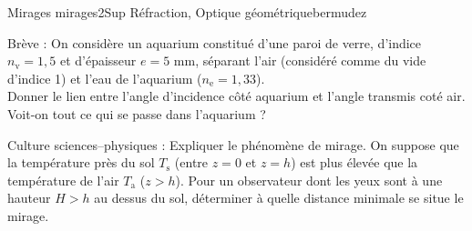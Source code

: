 \begin{exercise}{Mirages mirages}{2}{Sup}
{Réfraction, Optique géométrique}{bermudez}

\begin{questions}
    \question \textsf{Brève :} On considère un aquarium constitué d'une paroi de verre, d'indice $n_\text{v} = 1,5$ et d'épaisseur $e = 5$ mm, séparant l'air (considéré comme du vide d'indice 1) et l'eau de l'aquarium ($n_\text{e} = 1,33$). \\
    Donner le lien entre l'angle d'incidence côté aquarium et l'angle transmis coté air. Voit-on tout ce qui se passe dans l'aquarium ?
    
    
    \question \textsf{Culture sciences--physiques :} Expliquer le phénomène de mirage.
    \question On suppose que la température près du sol $T_\text{s}$ (entre $z=0$ et $z=h$) est plus élevée que la température de l'air $T_\text{a}$ ($z>h$). Pour un observateur dont les yeux sont à une hauteur $H > h$ au dessus du sol, déterminer à quelle distance minimale se situe le mirage.
\end{questions}

\end{exercise}
